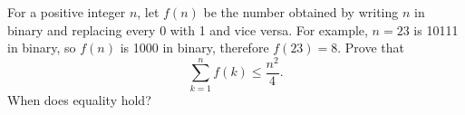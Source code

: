 \documentclass{article}
\begin{document}
\setlength{\parindent}{0pt}
For a positive integer $n$, let $f(n)$ be the number obtained by writing $n$ in binary and replacing every 0 with 1 and vice versa. For example, $n=23$ is 10111 in binary, so $f(n)$ is 1000 in binary, therefore $f(23) =8$. Prove that\[\sum_{k=1}^n f(k)\leq\frac{n^2}{4}.\]When does equality hold?
\end{document}
